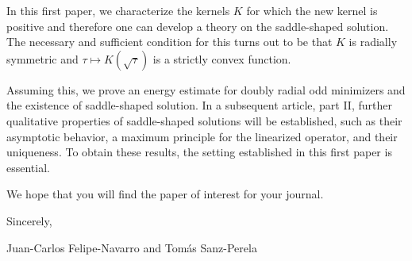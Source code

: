 \documentclass[11pt]{article}
\begin{document}
\medskip

In this first paper, we characterize the kernels $K$ for which the new kernel is positive and therefore one can develop a theory on the saddle-shaped solution. The necessary and sufficient condition for this turns out to be that $K$ is radially symmetric and $\tau\mapsto K(\sqrt \tau)$ is a strictly convex function.

\medskip

Assuming this, we prove an energy estimate for doubly radial odd minimizers and the existence of saddle-shaped solution. In a subsequent article, part II, further qualitative properties of saddle-shaped solutions will be established, such as their asymptotic behavior, a maximum principle for the linearized operator, and their uniqueness. To obtain these results, the setting established in this first paper is essential.

\medskip

We hope that you will find the paper of interest for your journal.

\medskip

Sincerely,

\vspace{1cm}

Juan-Carlos Felipe-Navarro and Tomás Sanz-Perela
\end{document}
